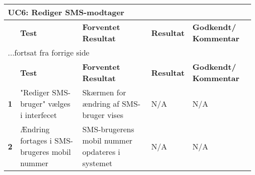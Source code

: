 
\begin{center}
\begin{longtable}{|p{}|p{}|p{}|p{}|p{}|} %
\hline
\multicolumn{5}{|l|}{\textbf{UC6: Rediger SMS-modtager}} \\ \hline
\multicolumn{1}{|c|}{} &
\textbf{Test} &
\textbf{Forventet \newline Resultat} &
\textbf{Resultat} &
\textbf{Godkendt/ \newline Kommentar} \\ \hline 
\endfirsthead

\multicolumn{5}{l}{...fortsat fra forrige side} \\ \hline 
\multicolumn{1}{|c|}{} &
\textbf{Test} &
\textbf{Forventet \newline Resultat} &
\textbf{Resultat} &
\textbf{Godkendt/ \newline Kommentar} \\ \hline 
\endhead


\textbf{1} &
"Rediger SMS-bruger" vælges i interfecet &
Skærmen for ændring af SMS-bruger vises &
N/A &
N/A \\\hline

\textbf{2} &
Ændring fortages i SMS-brugeres mobil nummer &
SMS-brugerens mobil nummer opdateres i systemet &
N/A &
N/A \\\hline


	\end{longtable}
	\label{ATUC6} 
\end{center}